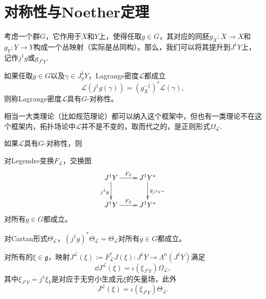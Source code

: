 \section{对称性与Noether定理}

考虑一个群$G$，它作用于$X$和$Y$上，使得任取$g\in G$，其对应的同胚$g_X:X\to X$和$g_Y:Y\to Y$构成一个丛映射（实际是丛同构）。那么，我们可以将其提升到$J^1Y$上，记作$j^1g$或$g_{J^1Y}$.

\begin{para}[Lagrange密度的对称性]
    如果任取$g\in G$以及$\gamma\in J_y^1 Y$，Lagrange密度$\mathcal L$都成立
    \[
        \mathcal L(j^1g(\gamma))=(g_X^{-1})^*\mathcal L(\gamma),
    \]
    则称Lagrange密度$\mathcal L$具有$G$-对称性。
\end{para}

相当一大类理论（比如规范理论）都可以纳入这个框架中，但也有一类理论不在这个框架内，拓扑场论中$\mathcal L$并不是不变的，取而代之的，是正则形式$\Omega_{\mathcal L}$.

\begin{pro}
    如果$\mathcal L$具有$G$-对称性，则
    \begin{compactenum}
        \item 对Legendre变换$F_{\mathcal L}$，交换图
        \[
            \xymatrix{
                J^1Y\ar[r]^-{F_{\mathcal L}}\ar[d]_{j^1g}&J^1Y^*\ar[d]^{g_{j^1Y^*}}\\ 
                J^1Y\ar[r]^-{F_{\mathcal L}}&J^1Y^*
            }
        \]
        对所有$g\in G$都成立。
        \item 对Cartan形式$\Theta_{\mathcal L}$，$(j^1g)^*\Theta_{\mathcal L}=\Theta_{\mathcal L}$对所有$g\in G$都成立。
        \item 对所有的$\xi \in \mathfrak{g}$，映射$J^\mathcal{L}(\xi):=F_{\mathcal L}^*J(\xi):J^1Y\to \Lambda^n(J^1Y)$满足
        \[
        \dd J^\mathcal{L}(\xi)=\iota(\xi_{J^1Y})\Omega_{\mathcal L},
        \]
        其中$\xi_{J^1Y}=j^1\xi_Y$是对应于无穷小生成元$\xi$的矢量场，此外
        \[
        J^\mathcal{L}(\xi)=\iota(\xi_{J^1Y})\Theta_{\mathcal L}.
        \]
    \end{compactenum}
\end{pro}

